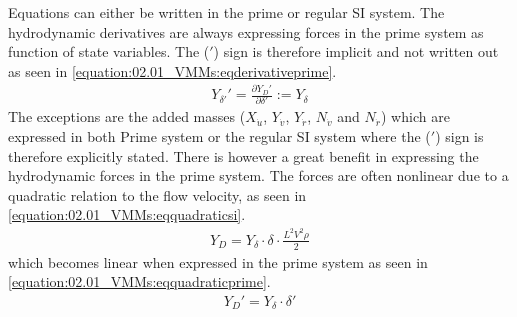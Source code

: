 \documentclass[review]{elsarticle}
\begin{document}
\sphinxAtStartPar
Equations can either be written in the prime or regular SI system. The hydrodynamic derivatives are always expressing forces in the prime system as function of state variables. The (\('\)) sign is therefore implicit and not written out as seen in \autoref{equation:02.01_VMMs:eqderivativeprime}.
\begin{equation}\label{equation:02.01_VMMs:eqderivativeprime}
\begin{split}\displaystyle Y_{\delta'}'=\frac{\partial Y_D'}{\partial \delta'} := Y_{\delta} \end{split}
\end{equation}
\sphinxAtStartPar
The exceptions are the added masses (\(X_{\dot{u}}\), \(Y_{\dot{v}}\), \(Y_{\dot{r}}\), \(N_{\dot{v}}\) and \(N_{\dot{r}}\)) which are expressed in both Prime system or the regular SI system where the (\('\)) sign is therefore
explicitly stated.
There is however a great benefit in expressing the hydrodynamic forces in the prime system. The forces are often nonlinear due to a quadratic relation to the flow velocity, as seen in \autoref{equation:02.01_VMMs:eqquadraticsi}.
\begin{equation}\label{equation:02.01_VMMs:eqquadraticsi}
\begin{split}\displaystyle Y_{D}=Y_{\delta} \cdot \delta \cdot \frac{L^2V^2\rho}{2}\end{split}
\end{equation}
\sphinxAtStartPar
which becomes linear when expressed in the prime system as seen in \autoref{equation:02.01_VMMs:eqquadraticprime}.
\begin{equation}\label{equation:02.01_VMMs:eqquadraticprime}
\begin{split}\displaystyle Y_{D}'=Y_{\delta} \cdot \delta'\end{split}
\end{equation}
\end{document}
